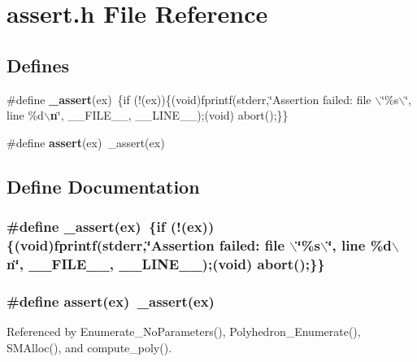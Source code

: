 \section{assert.h File Reference}
\label{assert_8h}
\subsection*{Defines}
\begin{CompactItemize}
\item 
\#define {\bf \_\-assert}(ex)\ \{if (!(ex))\{(void)fprintf(stderr,\char`\"{}Assertion failed: file $\backslash$\char`\"{}\%s$\backslash$\char`\"{}, line \%d$\backslash${\bf n}\char`\"{}, \_\-\_\-FILE\_\-\_\-, \_\-\_\-LINE\_\-\_\-);(void) abort();\}\}
\item 
\#define {\bf assert}(ex)\ \_\-assert(ex)
\end{CompactItemize}


\subsection{Define Documentation}
\subsubsection{\setlength{\rightskip}{0pt plus 5cm}\#define \_\-assert(ex)\ \{if (!(ex))\{(void)fprintf(stderr,\char`\"{}Assertion failed: file $\backslash$\char`\"{}\%s$\backslash$\char`\"{}, line \%d$\backslash${\bf n}\char`\"{}, \_\-\_\-FILE\_\-\_\-, \_\-\_\-LINE\_\-\_\-);(void) abort();\}\}}\label{assert_8h_a0}


\subsubsection{\setlength{\rightskip}{0pt plus 5cm}\#define assert(ex)\ \_\-assert(ex)}\label{assert_8h_a1}




Referenced by Enumerate\_\-No\-Parameters(), Polyhedron\_\-Enumerate(), SMAlloc(), and compute\_\-poly().

